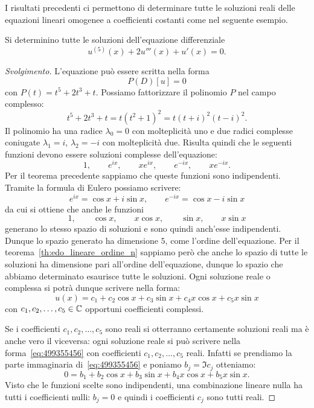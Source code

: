 I risultati precedenti ci permettono di determinare tutte le soluzioni reali delle equazioni lineari omogenee a coefficienti costanti come nel seguente esempio.

\begin{example}
Si determinino tutte le soluzioni dell'equazione differenziale
\[
  u^{(5)}(x) + 2 u'''(x) + u'(x) = 0.
\]
\end{example}
%
\begin{proof}[Svolgimento]
L'equazione può essere scritta nella forma
\[
  P(D) [u] = 0
\]
con $P(t) = t^5 + 2 t^3+t$. Possiamo fattorizzare il polinomio $P$ nel campo complesso:
\[
t^5 + 2t^3 +t = t(t^2+1)^2 = t (t+i)^2(t-i)^2.
\]
Il polinomio ha una radice $\lambda_0=0$ con molteplicità uno e due radici complesse coniugate $\lambda_1 = i$, $\lambda_2=-i$ con molteplicità due.
Risulta quindi che le seguenti funzioni devono essere soluzioni complesse dell'equazione:
\[
  1, \qquad
  e^{ix}, \qquad
  x e^{ix}, \qquad
  e^{-ix}, \qquad
  x e^{-ix}.
\]
Per il teorema precedente sappiamo che queste funzioni sono indipendenti.
Tramite la formula di Eulero possiamo scrivere:
\[
  e^{ix} = \cos x + i \sin x, \qquad 
  e^{-ix} = \cos x - i \sin x
\]
da cui si ottiene che anche le funzioni
\begin{equation}\label{eq:4995566}
 1, \qquad
 \cos x, \qquad
 x \cos x, \qquad
 \sin x, \qquad
 x \sin x
\end{equation}
generano lo stesso spazio di soluzioni e sono quindi anch'esse indipendenti.
Dunque lo spazio generato ha dimensione $5$, come l'ordine dell'equazione.
Per il teorema~\ref{th:edo_lineare_ordine_n}%
sappiamo però che anche lo spazio di tutte le soluzioni ha dimensione 
pari all'ordine dell'equazione, 
dunque lo spazio che abbiamo determinato esaurisce tutte le soluzioni. 
Ogni soluzione reale o complessa si potrà dunque scrivere nella forma:
\begin{equation}\label{eq:499355456}
  u(x) = c_1 + c_2 \cos x + c_3 \sin x + c_4 x \cos x + c_5 x \sin x
\end{equation}
con $c_1, c_2, \dots, c_5 \in \mathbb C$ opportuni coefficienti
complessi.

Se i coefficienti $c_1, c_2, \dots, c_5$ sono reali si otterranno
certamente soluzioni reali ma è anche vero il viceversa: 
ogni soluzione reale si può scrivere nella forma~\eqref{eq:499355456}
con coefficienti $c_1, c_2, \dots, c_5$ reali.
Infatti se prendiamo la parte immaginaria di~\eqref{eq:499355456}
e poniamo $b_j= \Im c_j$
otteniamo:
\[
 0 = b_1 + b_2 \cos x + b_3 \sin x + b_4 x \cos x + b_5 x \sin x.
\]
Visto che le funzioni scelte sono indipendenti, una combinazione
lineare nulla ha tutti i coefficienti nulli: $b_j=0$ e quindi
i coefficienti $c_j$ sono tutti reali.
\end{proof}


